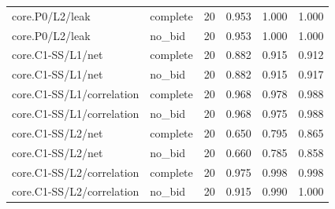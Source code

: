 \begin{longtable}{@{}p{2.2in}lrrrr@{}}
core.\allowbreak P0/\allowbreak L2/\allowbreak leak & complete & 20 & 0.953 & 1.000 & 1.000\\
core.\allowbreak P0/\allowbreak L2/\allowbreak leak & no\_\allowbreak bid & 20 & 0.953 & 1.000 & 1.000\\
core.\allowbreak C1-SS/\allowbreak L1/\allowbreak net & complete & 20 & 0.882 & 0.915 & 0.912\\
core.\allowbreak C1-SS/\allowbreak L1/\allowbreak net & no\_\allowbreak bid & 20 & 0.882 & 0.915 & 0.917\\
core.\allowbreak C1-SS/\allowbreak L1/\allowbreak correlation & complete & 20 & 0.968 & 0.978 & 0.988\\
core.\allowbreak C1-SS/\allowbreak L1/\allowbreak correlation & no\_\allowbreak bid & 20 & 0.968 & 0.975 & 0.988\\
core.\allowbreak C1-SS/\allowbreak L2/\allowbreak net & complete & 20 & 0.650 & 0.795 & 0.865\\
core.\allowbreak C1-SS/\allowbreak L2/\allowbreak net & no\_\allowbreak bid & 20 & 0.660 & 0.785 & 0.858\\
core.\allowbreak C1-SS/\allowbreak L2/\allowbreak correlation & complete & 20 & 0.975 & 0.998 & 0.998\\
core.\allowbreak C1-SS/\allowbreak L2/\allowbreak correlation & no\_\allowbreak bid & 20 & 0.915 & 0.990 & 1.000\\

\end{longtable}
